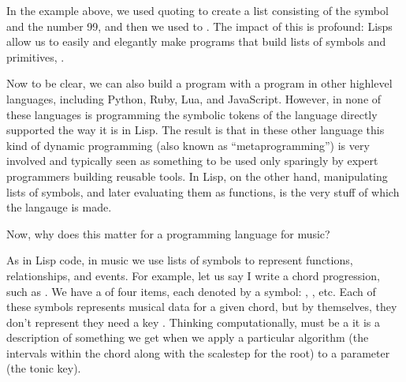 \documentclass[letterpaper,10pt,english]{sphinxmanual}
\begin{document}
\begin{sphinxVerbatim}[commandchars=\\\{\}]
\end{sphinxVerbatim}

\sphinxAtStartPar
In the example above, we used quoting to create
a list consisting of the symbol  and the number 99, and then
we used  to .
The impact of this is profound:
Lisps allow us to easily and elegantly make programs that build lists of symbols and primitives,
.

\sphinxAtStartPar
Now to be clear, we can also build a program with a program in other high\sphinxhyphen{}level languages, including Python, Ruby, Lua, and JavaScript.
However, in none of these languages is programming  the symbolic tokens of the language directly supported the way it is in Lisp.
The result is that in these other language this kind of dynamic programming (also known as “meta\sphinxhyphen{}programming”) is very involved and
typically seen as something to be used only sparingly by expert programmers building reusable tools.
In Lisp, on the other hand, manipulating lists of symbols, and later evaluating them as functions, is the very stuff of which the langauge is made.

\sphinxAtStartPar
Now, why does this matter for a programming language for music?

\sphinxAtStartPar
As in Lisp code, in music we use lists of symbols to represent functions, relationships, and events.
For example, let us say I write a chord progression, such as .
We have a  of four items, each denoted by a symbol: , , etc.
Each of these symbols represents musical data for a given chord, but by themselves, they don’t represent  \sphinxhyphen{}
they need a key .
Thinking computationally,  must be a  \sphinxhyphen{} it is a description of something we get when we apply a
particular algorithm (the intervals within the chord along with the scale\sphinxhyphen{}step for the root) to a parameter (the tonic key).
\end{document}
